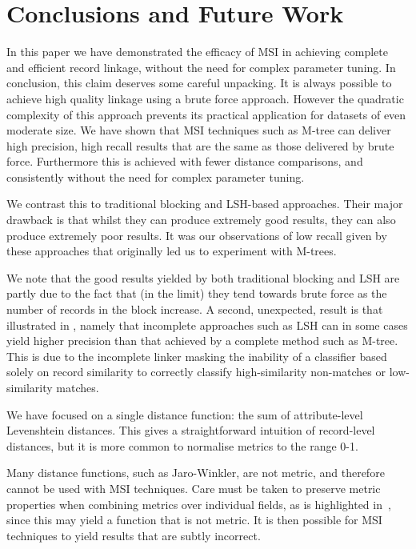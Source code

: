\documentclass{llncs}
\begin{document}

\section{Conclusions and Future Work\label{sec-concl}}

In this paper we have demonstrated the efficacy of MSI in achieving
complete and efficient record linkage, without the need for complex
parameter tuning. In conclusion, this claim deserves some careful
unpacking. It is always possible to achieve high quality linkage using a
brute force approach. However the quadratic complexity of this approach
prevents its practical application for datasets of even moderate size.
We have shown that MSI techniques such as M-tree can deliver high
precision, high recall results that are the same as those delivered by
brute force. Furthermore this is achieved with fewer distance
comparisons, and consistently without the need for complex parameter
tuning.

We contrast this to traditional blocking and LSH-based approaches. Their
major drawback is that whilst they can produce extremely good results,
they can also produce extremely poor results. It was our observations of
low recall given by these approaches that originally led us to
experiment with M-trees.

We note that the good results yielded by both traditional blocking and
LSH are partly due to the fact that (in the limit) they tend towards
brute force as the number of records in the block increase. A second,
unexpected, result is that illustrated in
, namely that incomplete approaches
such as LSH can in some cases yield higher precision than that achieved
by a complete method such as M-tree. This is due to the incomplete
linker masking the inability of a classifier based solely on record
similarity to correctly classify high-similarity non-matches or
low-similarity matches.

We have focused on a single distance function: the sum of
attribute-level Levenshtein distances. This gives a straightforward
intuition of record-level distances, but it is more common to normalise
metrics to the range 0-1.

Many distance functions, such as Jaro-Winkler, are not metric, and
therefore cannot be used with MSI techniques. Care must be taken to
preserve metric properties when combining metrics over individual
fields, as is highlighted in~\cite{Yujian2007}, since this may yield a
function that is not metric. It is then possible for MSI techniques to
yield results that are subtly incorrect.
\end{document}
